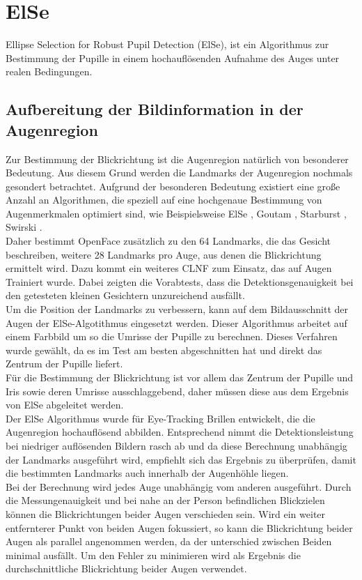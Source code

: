 \section{ElSe}
\label{ElSe}
Ellipse Selection for Robust Pupil Detection (ElSe), ist ein Algorithmus zur Bestimmung der Pupille in einem hochauflösenden Aufnahme des Auges unter realen Bedingungen.
\subsection{Aufbereitung der Bildinformation in der Augenregion}
\label{verbesserung_ElSe}
Zur Bestimmung der Blickrichtung ist die Augenregion natürlich von besonderer Bedeutung. Aus diesem Grund werden die Landmarks der Augenregion nochmals gesondert betrachtet. Aufgrund der besonderen Bedeutung existiert eine große Anzahl an Algorithmen, die speziell auf eine hochgenaue Bestimmung von Augenmerkmalen optimiert sind, wie Beispielsweise ElSe \cite{ElSe}, Goutam \cite{Eye_FastCorner}, Starburst \cite{Starburst}, Swirski \cite{Swirski2012}.\\
Daher bestimmt OpenFace zusätzlich zu den 64 Landmarks, die das Gesicht beschreiben, weitere 28 Landmarks pro Auge, aus denen die Blickrichtung ermittelt wird. Dazu kommt ein weiteres CLNF zum Einsatz, das auf Augen Trainiert wurde. Dabei zeigten die Vorabtests, dass die Detektionsgenauigkeit bei den getesteten kleinen Gesichtern unzureichend ausfällt.\\
Um die Position der Landmarks zu verbessern, kann auf dem Bildausschnitt der Augen der ElSe-Algotithmus eingesetzt werden. Dieser Algorithmus arbeitet auf einem Farbbild um so die Umrisse der Pupille zu berechnen. Dieses Verfahren wurde gewählt, da es im Test \cite{ElSe} am besten abgeschnitten hat und direkt das Zentrum der Pupille liefert.\\
Für die Bestimmung der Blickrichtung ist vor allem das Zentrum der Pupille und Iris sowie deren Umrisse ausschlaggebend, daher müssen diese aus dem Ergebnis von ElSe abgeleitet werden.\\
Der ElSe Algorithmus wurde für Eye-Tracking Brillen entwickelt, die die Augenregion hochauflösend abbilden. Entsprechend nimmt die Detektionsleistung bei niedriger auflösenden Bildern rasch ab und da diese Berechnung unabhängig der Landmarks ausgeführt wird, empfiehlt sich das Ergebnis zu überprüfen, damit die bestimmten Landmarks auch innerhalb der Augenhöhle liegen.\\
Bei der Berechnung wird jedes Auge unabhängig vom anderen ausgeführt. Durch die Messungenauigkeit und bei nahe an der Person befindlichen Blickzielen können die Blickrichtungen beider Augen verschieden sein. Wird ein weiter entfernterer Punkt von beiden Augen fokussiert, so kann die Blickrichtung beider Augen als parallel angenommen werden, da der unterschied zwischen Beiden minimal ausfällt. Um den Fehler zu minimieren wird als Ergebnis die durchschnittliche Blickrichtung beider Augen verwendet.
